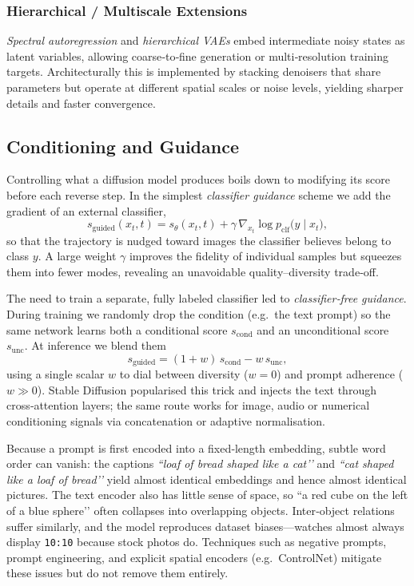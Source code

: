 \documentclass{article}
\begin{document}
\subsubsection{Hierarchical / Multiscale Extensions}  
\emph{Spectral autoregression} and \emph{hierarchical VAEs} embed intermediate noisy states as latent variables, allowing coarse‑to‑fine generation or multi‑resolution training targets. Architecturally this is implemented by stacking denoisers that share parameters but operate at different spatial scales or noise levels, yielding sharper details and faster convergence.

\subsection{Conditioning and Guidance}
Controlling what a diffusion model produces boils down to modifying its score before each reverse step.  In the simplest \emph{classifier guidance} scheme we add the gradient of an external classifier,
\[
  s_{\mathrm{guided}}(x_t,t)
  = s_\theta(x_t,t)
    + \gamma\,\nabla_{x_t}\log p_{\mathrm{clf}}\!\bigl(y\mid x_t\bigr),
\]
so that the trajectory is nudged toward images the classifier believes belong to class \(y\).  A large weight \(\gamma\) improves the fidelity of individual samples but squeezes them into fewer modes, revealing an unavoidable quality–diversity trade‑off.

The need to train a separate, fully labeled classifier led to \emph{classifier‑free guidance}.  During training we randomly drop the condition (e.g.\ the text prompt) so the same network learns both a conditional score \(s_{\mathrm{cond}}\) and an unconditional score \(s_{\mathrm{unc}}\).  At inference we blend them
\[
  s_{\mathrm{guided}}
  = (1+w)\,s_{\mathrm{cond}} - w\,s_{\mathrm{unc}},
\]
using a single scalar \(w\) to dial between diversity (\(w\!=\!0\)) and prompt adherence (\(w\!\gg\!0\)).  Stable Diffusion popularised this trick and injects the text through cross‑attention layers; the same route works for image, audio or numerical conditioning signals via concatenation or adaptive normalisation.

Because a prompt is first encoded into a fixed‑length embedding, subtle word order can vanish: the captions \textit{“loaf of bread shaped like a cat’’} and \textit{“cat shaped like a loaf of bread’’} yield almost identical embeddings and hence almost identical pictures.  The text encoder also has little sense of space, so “a red cube on the left of a blue sphere’’ often collapses into overlapping objects.  Inter‑object relations suffer similarly, and the model reproduces dataset biases—watches almost always display \texttt{10:10} because stock photos do.  Techniques such as negative prompts, prompt engineering, and explicit spatial encoders (e.g.\ ControlNet) mitigate these issues but do not remove them entirely.
\end{document}
